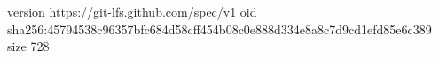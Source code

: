 version https://git-lfs.github.com/spec/v1
oid sha256:45794538c96357bfc684d58cff454b08c0e888d334e8a8c7d9cd1efd85e6c389
size 728
